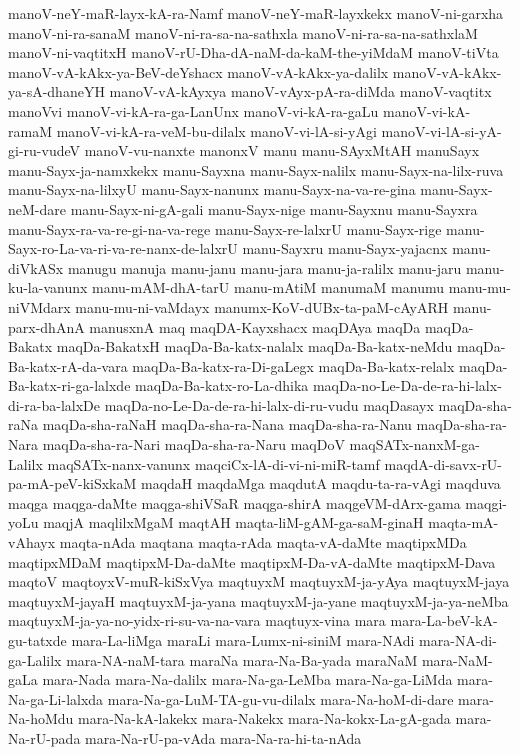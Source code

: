 {manoV-neY-maR-layx-kA-ra-Namf
manoV-neY-maR-layxkekx
manoV-ni-garxha
manoV-ni-ra-sanaM
manoV-ni-ra-sa-na-sathxla
manoV-ni-ra-sa-na-sathxlaM
manoV-ni-vaqtitxH
manoV-rU-Dha-dA-naM-da-kaM-the-yiMdaM
manoV-tiVta
manoV-vA-kAkx-ya-BeV-deYshacx
manoV-vA-kAkx-ya-dalilx
manoV-vA-kAkx-ya-sA-dhaneYH
manoV-vA-kAyxya
manoV-vAyx-pA-ra-diMda
manoV-vaqtitx
manoVvi
manoV-vi-kA-ra-ga-LanUnx
manoV-vi-kA-ra-gaLu
manoV-vi-kA-ramaM
manoV-vi-kA-ra-veM-bu-dilalx
manoV-vi-lA-si-yAgi
manoV-vi-lA-si-yA-gi-ru-vudeV
manoV-vu-nanxte
manonxV
manu
manu-SAyxMtAH
manuSayx
manu-Sayx-ja-namxkekx
manu-Sayxna
manu-Sayx-nalilx
manu-Sayx-na-lilx-ruva
manu-Sayx-na-lilxyU
manu-Sayx-nanunx
manu-Sayx-na-va-re-gina
manu-Sayx-neM-dare
manu-Sayx-ni-gA-gali
manu-Sayx-nige
manu-Sayxnu
manu-Sayxra
manu-Sayx-ra-va-re-gi-na-va-rege
manu-Sayx-re-lalxrU
manu-Sayx-rige
manu-Sayx-ro-La-va-ri-va-re-nanx-de-lalxrU
manu-Sayxru
manu-Sayx-yajacnx
manu-diVkASx
manugu
manuja
manu-janu
manu-jara
manu-ja-ralilx
manu-jaru
manu-ku-la-vanunx
manu-mAM-dhA-tarU
manu-mAtiM
manumaM
manumu
manu-mu-niVMdarx
manu-mu-ni-vaMdayx
manumx-KoV-dUBx-ta-paM-cAyARH
manu-parx-dhAnA
manusxnA
maq
maqDA-Kayxshacx
maqDAya
maqDa
maqDa-Bakatx
maqDa-BakatxH
maqDa-Ba-katx-nalalx
maqDa-Ba-katx-neMdu
maqDa-Ba-katx-rA-da-vara
maqDa-Ba-katx-ra-Di-gaLegx
maqDa-Ba-katx-relalx
maqDa-Ba-katx-ri-ga-lalxde
maqDa-Ba-katx-ro-La-dhika
maqDa-no-Le-Da-de-ra-hi-lalx-di-ra-ba-lalxDe
maqDa-no-Le-Da-de-ra-hi-lalx-di-ru-vudu
maqDasayx
maqDa-sha-raNa
maqDa-sha-raNaH
maqDa-sha-ra-Nana
maqDa-sha-ra-Nanu
maqDa-sha-ra-Nara
maqDa-sha-ra-Nari
maqDa-sha-ra-Naru
maqDoV
maqSATx-nanxM-ga-Lalilx
maqSATx-nanx-vanunx
maqciCx-lA-di-vi-ni-miR-tamf
maqdA-di-savx-rU-pa-mA-peV-kiSxkaM
maqdaH
maqdaMga
maqdutA
maqdu-ta-ra-vAgi
maqduva
maqga
maqga-daMte
maqga-shiVSaR
maqga-shirA
maqgeVM-dArx-gama
maqgi-yoLu
maqjA
maqlilxMgaM
maqtAH
maqta-liM-gAM-ga-saM-ginaH
maqta-mA-vAhayx
maqta-nAda
maqtana
maqta-rAda
maqta-vA-daMte
maqtipxMDa
maqtipxMDaM
maqtipxM-Da-daMte
maqtipxM-Da-vA-daMte
maqtipxM-Dava
maqtoV
maqtoyxV-muR-kiSxVya
maqtuyxM
maqtuyxM-ja-yAya
maqtuyxM-jaya
maqtuyxM-jayaH
maqtuyxM-ja-yana
maqtuyxM-ja-yane
maqtuyxM-ja-ya-neMba
maqtuyxM-ja-ya-no-yidx-ri-su-va-na-vara
maqtuyx-vina
mara
mara-La-beV-kA-gu-tatxde
mara-La-liMga
maraLi
mara-Lumx-ni-siniM
mara-NAdi
mara-NA-di-ga-Lalilx
mara-NA-naM-tara
maraNa
mara-Na-Ba-yada
maraNaM
mara-NaM-gaLa
mara-Nada
mara-Na-dalilx
mara-Na-ga-LeMba
mara-Na-ga-LiMda
mara-Na-ga-Li-lalxda
mara-Na-ga-LuM-TA-gu-vu-dilalx
mara-Na-hoM-di-dare
mara-Na-hoMdu
mara-Na-kA-lakekx
mara-Nakekx
mara-Na-kokx-La-gA-gada
mara-Na-rU-pada
mara-Na-rU-pa-vAda
mara-Na-ra-hi-ta-nAda
}
